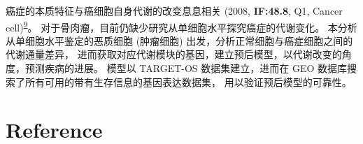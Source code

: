 \documentclass[
]{article}
\begin{document}
癌症的本质特征与癌细胞自身代谢的改变息息相关 (2008, \textbf{IF:48.8}, Q1, Cancer cell)\textsuperscript{\protect\hyperlink{ref-Tumor_cell_meta_Kroeme_2008}{9}}。
对于骨肉瘤，目前仍缺少研究从单细胞水平探究癌症的代谢变化。
本分析从单细胞水平鉴定的恶质细胞 (肿瘤细胞) 出发，分析正常细胞与癌症细胞之间的代谢通量差异，
进而获取对应代谢模块的基因，建立预后模型，以代谢改变的角度，预测疾病的进展。
模型以 TARGET-OS 数据集建立，进而在 GEO 数据库搜索了所有可用的带有生存信息的基因表达数据集，
用以验证预后模型的可靠性。

\hypertarget{bibliography}{%
\section*{Reference}\label{bibliography}}

\hypertarget{refs}{}
\end{document}

